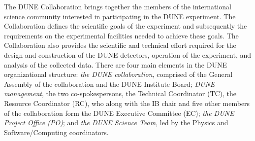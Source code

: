 The DUNE Collaboration brings together the members of the international science community 
interested in participating in the DUNE experiment.  The Collaboration defines the scientific goals of the experiment and subsequently 
the requirements on the experimental facilities needed to achieve these goals.  The Collaboration also provides the scientific and 
technical effort required for the design and construction of the DUNE detectors, operation of the experiment, and analysis of the 
collected data. There are four main elements in the DUNE organizational structure:  
{\it the DUNE collaboration}, comprised of the General Assembly of the collaboration and the DUNE Institute Board;     
{\it DUNE management}, the two co-spokespersons, the Technical Coordinator (TC), the Resource Coordinator (RC), who along
  with the IB chair and five other members of the collaboration form the DUNE Executive Committee (EC); 
{\it the DUNE Project Office (PO)}; and
{\it the DUNE Science Team}, led by the Physics and Software/Computing coordinators. 

